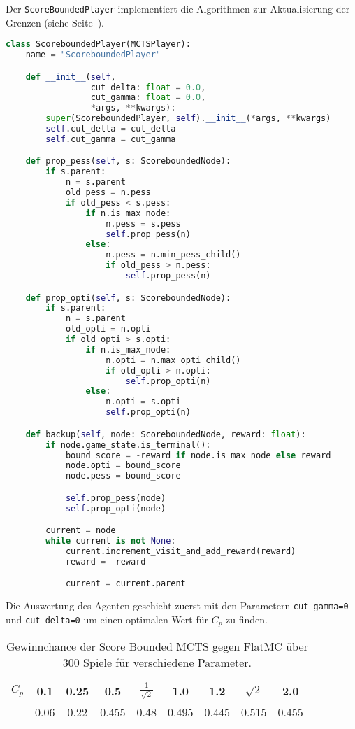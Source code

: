 Der \verb|ScoreBoundedPlayer| implementiert die Algorithmen zur Aktualisierung der Grenzen (siehe Seite~\pageref{algo:prop-scorebound}).

\begin{lstlisting}[language=Python,label={lst:scorebounded-player}]
class ScoreboundedPlayer(MCTSPlayer):
    name = "ScoreboundedPlayer"

    def __init__(self,
                 cut_delta: float = 0.0,
                 cut_gamma: float = 0.0,
                 *args, **kwargs):
        super(ScoreboundedPlayer, self).__init__(*args, **kwargs)
        self.cut_delta = cut_delta
        self.cut_gamma = cut_gamma

    def prop_pess(self, s: ScoreboundedNode):
        if s.parent:
            n = s.parent
            old_pess = n.pess
            if old_pess < s.pess:
                if n.is_max_node:
                    n.pess = s.pess
                    self.prop_pess(n)
                else:
                    n.pess = n.min_pess_child()
                    if old_pess > n.pess:
                        self.prop_pess(n)

    def prop_opti(self, s: ScoreboundedNode):
        if s.parent:
            n = s.parent
            old_opti = n.opti
            if old_opti > s.opti:
                if n.is_max_node:
                    n.opti = n.max_opti_child()
                    if old_opti > n.opti:
                        self.prop_opti(n)
                else:
                    n.opti = s.opti
                    self.prop_opti(n)

    def backup(self, node: ScoreboundedNode, reward: float):
        if node.game_state.is_terminal():
            bound_score = -reward if node.is_max_node else reward
            node.opti = bound_score
            node.pess = bound_score

            self.prop_pess(node)
            self.prop_opti(node)

        current = node
        while current is not None:
            current.increment_visit_and_add_reward(reward)
            reward = -reward

            current = current.parent
\end{lstlisting}

Die Auswertung des Agenten geschieht zuerst mit den Parametern \verb|cut_gamma=0| und \verb|cut_delta=0| um einen optimalen Wert für $C_p$ zu finden.

\begin{table}[h!]
\centering
\begin{tabular}{ |c||c|c|c|c|c|c|c|c| }
 \hline
 $C_p$ & 0.1 & 0.25 & 0.5 & $\frac{1}{\sqrt{2}}$ & 1.0 & 1.2 & $\sqrt{2}$ & 2.0 \\
 \hline
  & 0.06 & 0.22 & 0.455 & 0.48 & 0.495 & 0.445 & 0.515 & 0.455 \\
 \hline
\end{tabular}
\caption{Gewinnchance der Score Bounded MCTS gegen FlatMC über 300 Spiele für verschiedene Parameter.}
\label{tab:scorebound-flat-mc}
\end{table}

